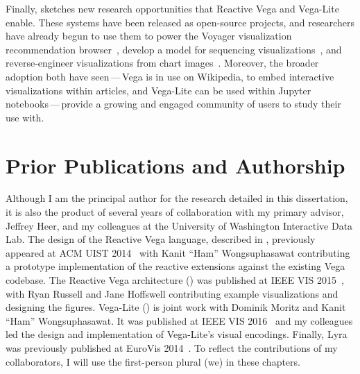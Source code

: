 Finally,  sketches new research opportunities that Reactive
Vega and Vega-Lite enable. These systems have been released as open-source
projects, and researchers have already begun to use them to power the Voyager
visualization recommendation browser~\cite{voyager,voyager2,compassql}, develop
a model for sequencing visualizations~\cite{kim:graphscape}, and
reverse-engineer visualizations from chart images~\cite{poco:reverse}. Moreover,
the broader adoption both have seen\,---\,Vega is in use on Wikipedia, to embed
interactive visualizations within articles, and Vega-Lite can be used within
Jupyter notebooks\,---\,provide a growing and engaged community of users to
study their use with.

\section{Prior Publications and Authorship}

Although I am the principal author for the research detailed in this
dissertation, it is also the product of several years of collaboration with my
primary advisor, Jeffrey Heer, and my colleagues at the University of Washington
Interactive Data Lab. The design of the Reactive Vega language, described in
, previously appeared at ACM UIST
2014~\cite{satyanarayan:declarative} with Kanit ``Ham'' Wongsuphasawat
contributing a prototype implementation of the reactive extensions against the
existing Vega codebase. The Reactive Vega architecture () was
published at IEEE VIS 2015~\cite{reactive-vega-arch}, with Ryan Russell and Jane
Hoffswell contributing example visualizations and designing the figures.
Vega-Lite () is joint work with Dominik Moritz and Kanit
``Ham'' Wongsuphasawat. It was published at IEEE VIS 2016~\cite{vega-lite} and
my colleagues led the design and implementation of Vega-Lite's visual encodings.
Finally, Lyra was previously published at EuroVis 2014~\cite{lyra}. To reflect
the contributions of my collaborators, I will use the first-person plural (we)
in these chapters.